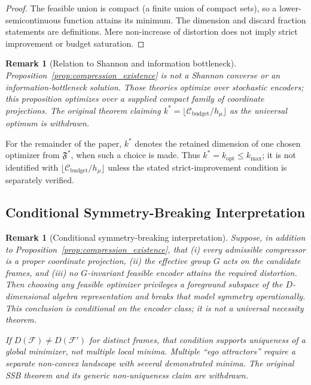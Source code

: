 \documentclass[12pt]{article}
\newtheorem{remark}[theorem]{Remark}
\begin{document}
\begin{proof}
The feasible union is compact (a finite union of compact sets), so a
lower-semicontinuous function attains its minimum.  The dimension and
discard fraction statements are definitions.  Mere non-increase of
distortion does not imply strict improvement or budget saturation.
\end{proof}

\begin{remark}[Relation to Shannon and information bottleneck]
Proposition~\ref{prop:compression_existence} is not a Shannon converse
or an information-bottleneck solution.  Those theories optimize over
stochastic encoders; this proposition optimizes over a supplied compact
family of coordinate projections.  The original theorem claiming
$k^*=\lfloor\mathcal C_{\mathrm{budget}}/h_\mu\rfloor$ as the universal
optimum is withdrawn.
\end{remark}

For the remainder of the paper, $k^*$ denotes the retained dimension of
one chosen optimizer from $\mathfrak F^*$, when such a choice is made.
Thus $k^*=k_{\mathrm{opt}}\leq k_{\max}$; it is not identified with
$\lfloor\mathcal C_{\mathrm{budget}}/h_\mu\rfloor$ unless the stated
strict-improvement condition is separately verified.

\subsection{Conditional Symmetry-Breaking Interpretation}
\label{subsec:SSB}

\begin{remark}[Conditional symmetry-breaking interpretation]
\label{rem:conditional_ssb}
Suppose, in addition to Proposition~\ref{prop:compression_existence},
that (i) every admissible compressor is a proper coordinate projection,
(ii) the effective group $G$ acts on the candidate frames, and
(iii) no $G$-invariant feasible encoder attains the required distortion.
Then choosing any feasible optimizer privileges a foreground subspace
of the $D$-dimensional algebra representation and breaks that model
symmetry operationally.  This conclusion is conditional on the encoder
class; it is not a universal necessity theorem.

If $D(\mathcal F)\neq D(\mathcal F')$ for distinct frames, that
condition supports uniqueness of a global minimizer, not multiple local
minima.  Multiple ``ego attractors'' require a separate non-convex
landscape with several demonstrated minima.  The original SSB theorem
and its generic non-uniqueness claim are withdrawn.
\end{remark}
\end{document}

